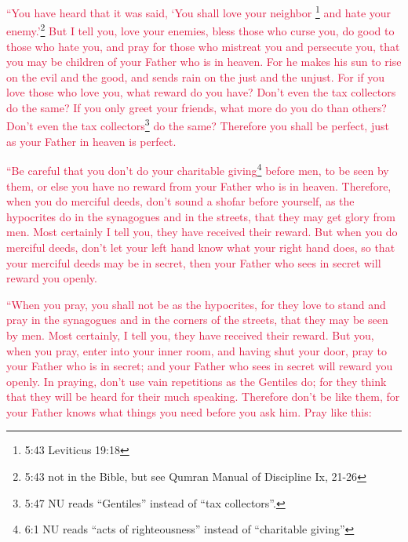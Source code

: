 \myverse{}\textcolor{crimson}{“You have heard that it was said, ‘You shall love your neighbor
}\footnote{5:43 Leviticus 19:18}
\textcolor{crimson}{and hate your enemy.’}\footnote{5:43 not in the Bible, but see Qumran Manual of Discipline Ix, 21-26}
\myverse{}\textcolor{crimson}{But I tell you, love your enemies, bless those who curse you, do good
	to those who hate you, and pray for those who mistreat you and persecute you,
}
\myverse{}\textcolor{crimson}{that you may be children of your Father who is in heaven. For he makes
	his sun to rise on the evil and the good, and sends rain on the just and the unjust.
}
\myverse{}\textcolor{crimson}{For if you love those who love you, what reward do you have? Don’t even
	the tax collectors do the same?
}
\myverse{}\textcolor{crimson}{If you only greet your friends, what more do you do than others? Don’t
	even the tax collectors}\footnote{5:47 NU reads “Gentiles” instead of “tax collectors”.}
\textcolor{crimson}{do the same?
}
\myverse{}\textcolor{crimson}{Therefore you shall be perfect, just as your Father in heaven is perfect.}


\mychapter{} \myverse*{}\textcolor{crimson}{“Be careful that you don’t do your charitable giving}\footnote{6:1 NU reads “acts of righteousness” instead of “charitable giving”}
\textcolor{crimson}{before men, to be seen by them, or else you have no reward from your Father who is in heaven.
}
\myverse{}\textcolor{crimson}{Therefore, when you do merciful deeds, don’t sound a shofar before yourself,
	as the hypocrites do in the synagogues and in the streets, that they may get glory from men. Most certainly
	I tell you, they have received their reward.
}
\myverse{}\textcolor{crimson}{But when you do merciful deeds, don’t let your left hand know what your
	right hand does,
}
\myverse{}\textcolor{crimson}{so that your merciful deeds may be in secret, then your Father who sees
	in secret will reward you openly.}

\myverse{}\textcolor{crimson}{“When you pray, you shall not be as the hypocrites, for they
	love to stand and pray in the synagogues and in the corners of the streets, that they may be seen by men.
	Most certainly, I tell you, they have received their reward.
}
\myverse{}\textcolor{crimson}{But you, when you pray, enter into your inner room, and having shut your
	door, pray to your Father who is in secret; and your Father who sees in secret will reward you openly.
}
\myverse{}\textcolor{crimson}{In praying, don’t use vain repetitions as the Gentiles do; for they think
	that they will be heard for their much speaking.
}
\myverse{}\textcolor{crimson}{Therefore don’t be like them, for your Father knows what things you need
	before you ask him.
}
\myverse{}\textcolor{crimson}{Pray like this:
}

